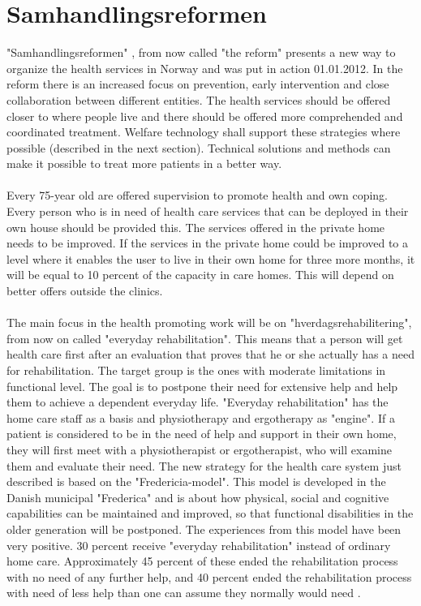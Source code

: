 \section{Samhandlingsreformen}
"Samhandlingsreformen" \cite{budsjett}\cite{regjering}, from now called "the reform" presents a new way to organize the health services in Norway and was put in action 01.01.2012. In the reform there is an increased focus on prevention, early intervention and close collaboration between different entities. The health services should be offered closer to where people live and there should be offered more comprehended and coordinated treatment. Welfare technology shall support these strategies where possible (described in the next section). Technical solutions and methods can make it possible to treat more patients in a better way. \\ \\
Every 75-year old are offered supervision to promote health and own coping. Every person who is in need of health care services that can be deployed in their own house should be provided this. The services offered in the private home needs to be improved. If the services in the private home could be improved to a level where it enables the user to live in their own home for three more months, it will be equal to 10 percent of the capacity in care homes. This will depend on better offers outside the clinics.\\ \\ The main focus in the health promoting work will be on "hverdagsrehabilitering", from now on called  "everyday rehabilitation". This means that a person will get health care first after an evaluation that proves that he or she actually has a need for rehabilitation. The target group is the ones with moderate limitations in functional level. The goal is to postpone their need for extensive help and help them to achieve a dependent everyday life.  "Everyday rehabilitation" has the home care staff as a basis and physiotherapy and ergotherapy as "engine". If a patient is considered to be in the need of help and support in their own home, they will first meet with a physiotherapist or ergotherapist, who will examine them and evaluate their need. The new strategy for the health care system just described is based on the "Fredericia-model". This model is developed in the Danish municipal "Frederica" and is about how physical, social and cognitive capabilities can be maintained and improved, so that functional disabilities in the older generation will be postponed. The experiences from this model have been very positive. 30 percent receive "everyday rehabilitation" instead of ordinary home care. Approximately 45 percent of these ended the rehabilitation process with no need of any further help, and 40 percent ended the rehabilitation process with need of less help than one can assume they normally would need \cite{budsjett}\cite{regjering}.
